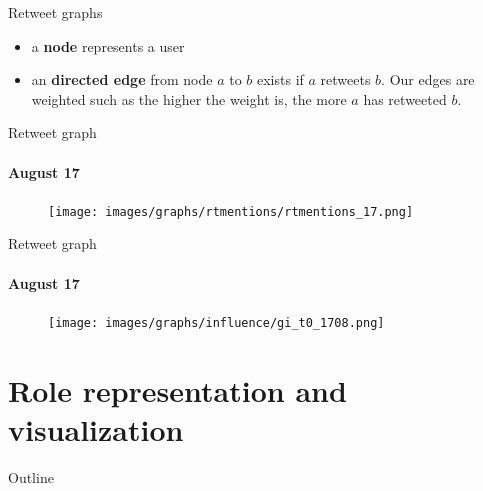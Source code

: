 \documentclass[first=dblue,second=red,logo=blueexc]{aaltoslides}
\begin{document}

\begin{frame}{Retweet graphs}
\begin{itemize}
\item a \textbf{node} represents a user
\item an \textbf{directed edge} from node $a$ to $b$ exists if $a$ retweets $b$. Our edges are weighted such as the higher the weight is, the more $a$ has retweeted $b$.
\end{itemize}
\end{frame}


\begin{frame}{Retweet graph}
\framesubtitle{August 17}
\begin{figure}[H]
\centering
\texttt{[image: images/graphs/rtmentions/rtmentions\_17.png]}
\end{figure}
\end{frame}


\begin{frame}{Retweet graph}
\framesubtitle{August 17}
\begin{figure}[H]
\centering
\texttt{[image: images/graphs/influence/gi\_t0\_1708.png]}
\label{gi17}
\end{figure}
\end{frame}


\section{Role representation and visualization}
\begin{frame}{Outline}
\tableofcontents[sectionstyle=show/shaded]
\end{frame}
\end{document}
